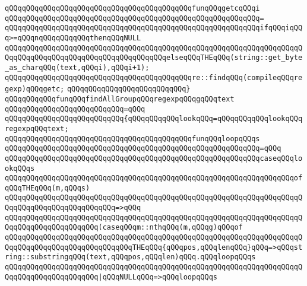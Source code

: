 \verb|qQQqqQQqqQQqqQQqqQQqqQQqqQQqqQQqqQQqqQQqqQQqfunqQQqgetcqQQqi|\newline
\verb|qQQqqQQqqQQqqQQqqQQqqQQqqQQqqQQqqQQqqQQqqQQqqQQqqQQqqQQqqQQq=|\newline
\verb|qQQqqQQqqQQqqQQqqQQqqQQqqQQqqQQqqQQqqQQqqQQqqQQqqQQqqQQqqQQqifqQQqiqQQq>=qQQqnqQQqqQQqqQQqthenqQQqNULL|\newline
\verb|qQQqqQQqqQQqqQQqqQQqqQQqqQQqqQQqqQQqqQQqqQQqqQQqqQQqqQQqqQQqqQQqqQQqqQQqqQQqqQQqqQQqqQQqqQQqqQQqqQQqqQQqqQQqelseqQQqTHEqQQq(string::get_byte_as_charqQQq(text,qQQqi),qQQqi+1);|\newline
\newline
\verb|qQQqqQQqqQQqqQQqqQQqqQQqqQQqqQQqqQQqqQQqqQQqre::findqQQq(compileqQQqregexp)qQQqgetc;|\newline
\verb|qQQqqQQqqQQqqQQqqQQqqQQqqQQq}|\newline
\newline
\verb|qQQqqQQqqQQqfunqQQqfindAllGroupqQQqregexpqQQqgqQQqtext|\newline
\verb|qQQqqQQqqQQqqQQqqQQqqQQqqQQq=qQQq|\newline
\verb|qQQqqQQqqQQqqQQqqQQqqQQqqQQq{qQQqqQQqqQQqlookqQQq=qQQqqQQqqQQqlookqQQqregexpqQQqtext;|\newline
\newline
\verb|qQQqqQQqqQQqqQQqqQQqqQQqqQQqqQQqqQQqqQQqqQQqfunqQQqloopqQQqs|\newline
\verb|qQQqqQQqqQQqqQQqqQQqqQQqqQQqqQQqqQQqqQQqqQQqqQQqqQQqqQQqqQQq=qQQq|\newline
\verb|qQQqqQQqqQQqqQQqqQQqqQQqqQQqqQQqqQQqqQQqqQQqqQQqqQQqqQQqqQQqcaseqQQqlookqQQqs|\newline
\newline
\verb|qQQqqQQqqQQqqQQqqQQqqQQqqQQqqQQqqQQqqQQqqQQqqQQqqQQqqQQqqQQqqQQqqQQqofqQQqTHEqQQq(m,qQQqs)|\newline
\verb|qQQqqQQqqQQqqQQqqQQqqQQqqQQqqQQqqQQqqQQqqQQqqQQqqQQqqQQqqQQqqQQqqQQqqQQqqQQqqQQqqQQqqQQqqQQqqQQq=>qQQq|\newline
\verb|qQQqqQQqqQQqqQQqqQQqqQQqqQQqqQQqqQQqqQQqqQQqqQQqqQQqqQQqqQQqqQQqqQQqqQQqqQQqqQQqqQQqqQQqqQQq(caseqQQqm::nthqQQq(m,qQQqg)qQQqof|\newline
\verb|qQQqqQQqqQQqqQQqqQQqqQQqqQQqqQQqqQQqqQQqqQQqqQQqqQQqqQQqqQQqqQQqqQQqqQQqqQQqqQQqqQQqqQQqqQQqqQQqqQQqTHEqQQq{qQQqpos,qQQqlenqQQq}qQQq=>qQQqstring::substringqQQq(text,qQQqpos,qQQqlen)qQQq.qQQqloopqQQqs|\newline
\verb|qQQqqQQqqQQqqQQqqQQqqQQqqQQqqQQqqQQqqQQqqQQqqQQqqQQqqQQqqQQqqQQqqQQqqQQqqQQqqQQqqQQqqQQqqQQq|\verb#|qQQqNULLqQQq=>qQQqloopqQQqs#\newline
